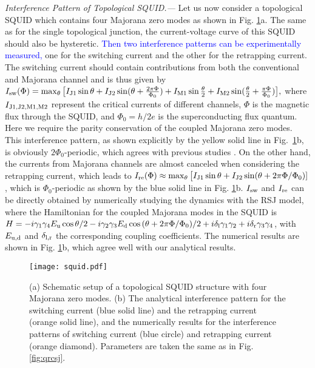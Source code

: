 \documentclass[aps,prl,twocolumn,showpacs,showpacs,10pt,superscriptaddress]{revtex4-1}
\newcommand{\blue}[1]{\textcolor{blue}{#1}}
\begin{document}
{\it Interference Pattern of Topological SQUID.---}
Let us now consider a topological SQUID which contains four Majorana zero modes as shown in Fig. \ref{fig:squid}a. The same as for the single topological junction, the current-voltage curve of this SQUID should also be hysteretic. \blue{Then two interference patterns can be experimentally measured,} one for the switching current and the other for the retrapping current. The switching current should contain contributions from both the conventional and Majorana channel and is thus given by
$I_{\rm sw} (\Phi) = \max_\theta  \big[I_{\rm J1} \sin \theta + I_{\rm J2} \sin (\theta + \frac{2\pi \Phi}  {\Phi_0} )+ I_{\rm M1}  \sin \frac{\theta}{2} + I_{\rm M2} \sin (\frac{\theta}{2}+\frac{\pi \Phi}{\Phi_0})\big],$
where $I_{{\rm J}1,{\rm J}2,{\rm M}1,{\rm M}2}$ represent the critical currents of different channels, $\Phi$ is the magnetic flux through the SQUID, and $\Phi_0 = h/2e$ is the superconducting flux quantum. Here we require the parity conservation of the coupled Majorana zero modes.
This interference pattern, as shown explicitly by the yellow solid line in Fig.~\ref{fig:squid}b, is obviously $2\Phi_0$-periodic, which agrees with previous studies \cite{beenakker11,veldhorst12}.
On the other hand, the currents from Majorana channels are almost canceled when considering the retrapping current, which leads to
$I_{\rm re} (\Phi) \approx \max_\theta\big[I_{\rm J1} \sin \theta + I_{\rm J2} \sin (\theta + 2\pi \Phi / \Phi_0) ]$,
which is $\Phi_0$-periodic as shown by the blue solid line in Fig. \ref{fig:squid}b.
$I_{\rm sw}$ and $I_{\rm re}$ can be directly obtained by numerically studying the dynamics with the RSJ model, where the Hamiltonian for the coupled Majorana modes in the SQUID is $H= - i\gamma_1 \gamma_4 E_{\rm u} \cos {\theta}/{2}
-  i\gamma_2 \gamma_3 E_{\rm d} \cos {(\theta+ 2\pi\Phi/\Phi_0)}/{2}
+ i\delta_{\rm l} \gamma_1 \gamma_2 + i\delta_{\rm r} \gamma_3 \gamma_4$,
with $E_{\rm u,d}$ and $\delta_{\rm l,r}$ the corresponding coupling coefficients. The numerical results are shown in Fig. \ref{fig:squid}b, which agree well with our analytical results.

\begin{figure}[t]
\begin{center}
\texttt{[image: squid.pdf]}
\caption{(a) Schematic setup of a topological SQUID structure with four Majorana zero modes. (b) The analytical interference pattern for the switching current (blue solid line) and the retrapping current (orange solid line), and the numerically results for the interference patterns of switching current (blue circle) and retrapping current (orange diamond). Parameters are taken the same as in Fig. \ref{fig:qrcsj}.}
\label{fig:squid}
\end{center}
\end{figure}
\end{document}
